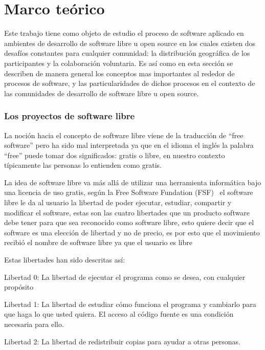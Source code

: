 

\chapter{Marco teórico}
Este trabajo tiene como objeto de estudio el proceso de software aplicado en ambientes de desarrollo de software libre u open source en los cuales existen dos desafíos constantes para cualquier comunidad: la distribución geográfica de los participantes y la colaboración voluntaria. Es así como en esta sección se describen de manera general los conceptos mas importantes al rededor de procesos de software, y las particularidades de dichos procesos en el contexto de las comunidades de desarrollo de software libre u open source.
\subsection{Los proyectos de software libre}
La noción hacia el concepto de software libre viene de la traducción de ``free software'' pero ha sido mal interpretada ya que en el idioma el inglés la palabra ``free'' puede tomar dos significados: gratis o libre, en nuestro contexto típicamente las personas lo entienden como gratis.

La idea de software libre va más allá de utilizar una herramienta informática bajo una licencia de uso gratis, según la Free Software Fundation (FSF) \ el software libre le da al usuario la libertad de poder ejecutar, estudiar, compartir y modificar el software, estas son las cuatro libertades que un producto software debe tener para que sea reconocido como software libre, esto quiere decir que el software es una elección de libertad y no de precio, es por esto que el movimiento recibió el nombre de software libre ya que el usuario es libre 

Estas libertades han sido descritas así:

Libertad 0: La libertad de ejecutar el programa como se desea, con cualquier propósito 

Libertad 1: La libertad de estudiar cómo funciona el programa y cambiarlo para que haga lo que usted quiera. El acceso al código fuente es una condición necesaria para ello.

Libertad 2: La libertad de redistribuir copias para ayudar a otras personas.

